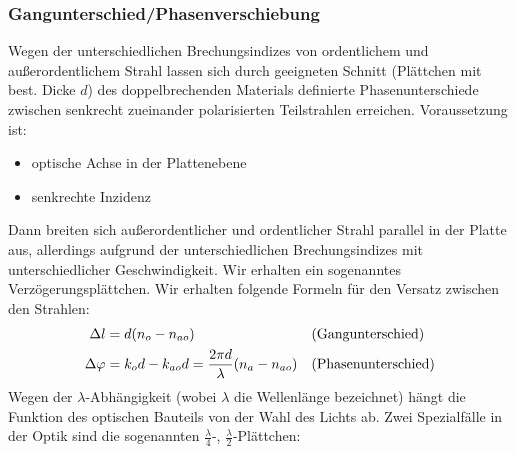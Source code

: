 \subsubsection{Gangunterschied/Phasenverschiebung}
Wegen der unterschiedlichen Brechungsindizes von ordentlichem und
außerordentlichem Strahl lassen sich durch geeigneten Schnitt
(Plättchen mit best. Dicke $d$) des
doppelbrechenden Materials definierte Phasenunterschiede zwischen
senkrecht zueinander polarisierten Teilstrahlen erreichen.
Voraussetzung ist:
\begin{itemize}
\item optische Achse in der Plattenebene
\item senkrechte Inzidenz
\end{itemize}
Dann breiten sich außerordentlicher und ordentlicher Strahl parallel
in der Platte aus, allerdings aufgrund der unterschiedlichen
Brechungsindizes mit unterschiedlicher Geschwindigkeit. Wir erhalten
ein sogenanntes Verzögerungsplättchen.
Wir erhalten folgende Formeln für den Versatz zwischen den Strahlen:
\begin{align*}
  \Delta l &= d(n_o-n_{ao}) 
  &&\text{(Gangunterschied\index{Doppelbrechung!Gangunterschied})}\\
  \Delta\varphi &= k_od - k_{ao}d = \frac{2\pi d}{\lambda}(n_a-n_{ao})
  &&\text{(Phasenunterschied\index{Doppelbrechung!Phasenunterschied})}
\end{align*}
Wegen der $\lambda$-Abhängigkeit (wobei $\lambda$ die Wellenlänge
bezeichnet) hängt die Funktion des optischen Bauteils von der Wahl des
Lichts ab. Zwei Spezialfälle in der Optik sind die sogenannten
$\frac{\lambda}{4}$-, $\frac{\lambda}{2}$-Plättchen:
